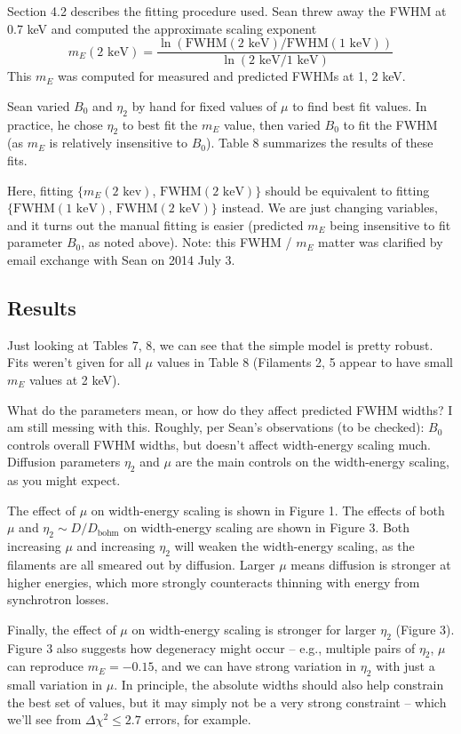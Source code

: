 \documentclass[10pt]{article}
\newcommand{\mt}{\mathrm}
\begin{document}
Section 4.2 describes the fitting procedure used.  Sean threw away the FWHM at
0.7 keV and computed the approximate scaling exponent
\[
    m_E(\text{2 keV}) = \frac{ \ln( \mathrm{FWHM}(\text{2 keV}) /
                                    \mathrm{FWHM}(\text{1 keV}) ) }
                             { \ln( \text{2 keV} / \text{1 keV} ) }
\]
This $m_E$ was computed for measured and predicted FWHMs at 1, 2 keV.

Sean varied $B_0$ and $\eta_2$ by hand for fixed values of $\mu$ to find best
fit values.  In practice, he chose $\eta_2$ to best fit the $m_E$ value, then
varied $B_0$ to fit the FWHM (as $m_E$ is relatively insensitive to $B_0$).
Table 8 summarizes the results of these fits.

Here, fitting $\{m_E(\text{2 kev})$, $\mathrm{FWHM}(\text{2 keV})\}$ should be
equivalent to fitting $\{\mathrm{FWHM}(\text{1 keV})$,
$\mathrm{FWHM}(\text{2 keV})\}$ instead.  We are just changing variables, and
it turns out the manual fitting is easier (predicted $m_E$ being insensitive to
fit parameter $B_0$, as noted above).  Note: this FWHM / $m_E$ matter was
clarified by email exchange with Sean on 2014 July 3.

\subsection{Results}

Just looking at Tables 7, 8, we can see that the simple model is pretty robust.
Fits weren't given for all $\mu$ values in Table 8 (Filaments 2, 5 appear to
have small $m_E$ values at 2 keV).

What do the parameters mean, or how do they affect predicted FWHM widths?
I am still messing with this.  Roughly, per Sean's observations (to be
checked): $B_0$ controls overall FWHM widths, but doesn't affect width-energy
scaling much.  Diffusion parameters $\eta_2$ and $\mu$ are the main controls on
the width-energy scaling, as you might expect.

The effect of $\mu$ on width-energy scaling is shown in Figure 1.
The effects of both $\mu$ and $\eta_2 \sim D/D_{\mt{bohm}}$ on width-energy
scaling are shown in Figure 3.  Both increasing $\mu$ and increasing $\eta_2$
will weaken the width-energy scaling, as the filaments are all smeared out by
diffusion.  Larger $\mu$ means diffusion is stronger at higher energies, which
more strongly counteracts thinning with energy from synchrotron losses.

Finally, the effect of $\mu$ on width-energy scaling is stronger for larger
$\eta_2$ (Figure 3).  Figure 3 also suggests how degeneracy might occur --
e.g., multiple pairs of $\eta_2$, $\mu$ can reproduce $m_E = -0.15$, and we can
have strong variation in $\eta_2$ with just a small variation in $\mu$.  In
principle, the absolute widths should also help constrain the best set of
values, but it may simply not be a very strong constraint -- which we'll see
from $\Delta\chi^2 \leq 2.7$ errors, for example.
\end{document}

